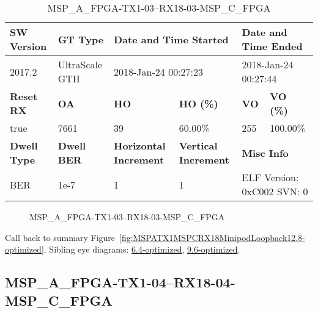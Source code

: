 \begin{table}[h]
\centering
\caption{MSP\_A\_FPGA-TX1-03--RX18-03-MSP\_C\_FPGA}
\label{tab:MSPAFPGATX103RX1803MSPCFPGA12.8-optimized}
\begin{tabular}{@{}|l|l|l|l|l|l|@{}}
\toprule
\textbf{SW Version}                & \textbf{GT Type}   & \multicolumn{2}{l|}{\textbf{Date and Time Started}}            & \multicolumn{2}{l|}{\textbf{Date and Time Ended}}        \\ \midrule
2017.2                       & UltraScale GTH          & \multicolumn{2}{l|}{2018-Jan-24 00:27:23}                   & \multicolumn{2}{l|}{2018-Jan-24 00:27:44}               \\ \midrule
\textbf{Reset RX}                  & \textbf{OA} & \textbf{HO}   & \textbf{HO (\%)} & \textbf{VO} & \textbf{VO (\%)} \\ \midrule
true & 7661        & 39          & 60.00\%        & 255        & 100.00\%       \\ \midrule
\textbf{Dwell Type}                & \textbf{Dwell BER} & \textbf{Horizontal Increment} & \textbf{Vertical Increment}    & \multicolumn{2}{l|}{\textbf{Misc Info}}                  \\ \midrule
BER                            & 1e-7        & 1        & 1           & \multicolumn{2}{l|}{ELF Version: 0xC002 SVN: 0}                         \\ \bottomrule
\end{tabular}
\end{table}

\begin{figure}[h]
\caption{MSP\_A\_FPGA-TX1-03--RX18-03-MSP\_C\_FPGA} \label{fig:MSPAFPGATX103RX1803MSPCFPGA12.8-optimized}
\end{figure}

Call back to summary Figure~\ref{fig:MSPATX1MSPCRX18MinipodLoopback12.8-optimized}.
Sibling eye diagrams: \hyperref[sec:MSPAFPGATX103RX1803MSPCFPGA6.4-optimized]{6.4-optimized}, \hyperref[sec:MSPAFPGATX103RX1803MSPCFPGA9.6-optimized]{9.6-optimized}.

\clearpage
\newpage


\subsection{MSP\_A\_FPGA-TX1-04--RX18-04-MSP\_C\_FPGA}\label{sec:MSPAFPGATX104RX1804MSPCFPGA12.8-optimized}


